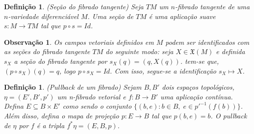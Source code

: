 \documentclass[12pt]{book}
\newtheorem{definicao}[teorema]{Definição}
\newtheorem{observacao}[teorema]{Observação}
\newcommand{\campossuaves}[1]{\mathfrak{X}(#1)}
\begin{document}
	\begin{definicao}
		(Seção do fibrado tangente) Seja $TM$ um $n$-fibrado tangente de uma $n$-variedade diferenciável $M$. Uma seção de $TM$ é uma aplicação suave $s:M \to TM$ tal que $p\circ s=Id$.
	\end{definicao}
	
	\begin{observacao}\label{observacao_identificacao_secao_campo_vetorial}
		Os campos vetoriais definidos em $M$ podem ser identificados com as seções do fibrado tangente $TM$ do seguinte modo: seja $X\in \campossuaves{M}$ e definida $s_{X}$ a seção do fibrado tangente por $s_{X}(q) = (q, X(q))$. tem-se que, $(p\circ s_{X})(q) = q$, logo $p\circ s_{X}=Id$. Com isso, segue-se a identificação $s_{X} \mapsto X$.
	\end{observacao}
	
	\begin{definicao}
		(Pullback de um fibrado) Sejam $B, B'$ dois espaços topológicos, $\eta=(E', B', p')$ um n-fibrado vetorial e $f:B\to B'$ uma aplicação contínua. Defina $E \subseteq B\times E'$ como sendo o conjunto $\{(b, e): b \in B,\; e \in p'^{-1}(f(b)) \}$. Além disso, defina o mapa de projeção $p:E\to B$ tal que $p(b,e) = b$. O pullback de $\eta$ por $f$ é a tripla $f^{*}\eta = (E,B, p)$.
	\end{definicao}
	
\end{document}
